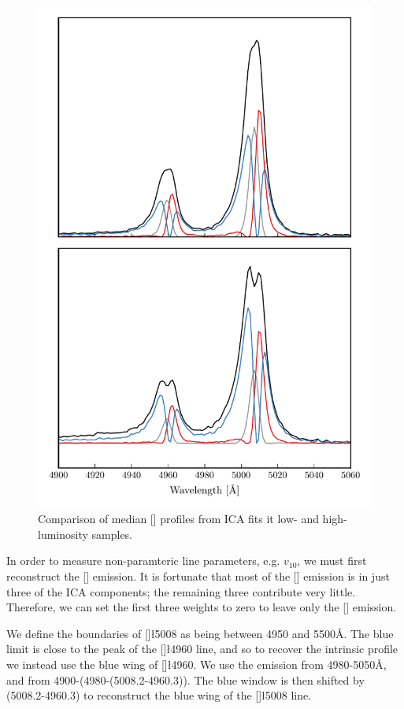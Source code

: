 \begin{figure}
    \centering
    \includegraphics[width=0.8\columnwidth]{figures/chapter04/mfica_components_oiii_comparison.pdf} 
    \caption{Comparison of median [] profiles from ICA fits it low- and high-luminosity samples. }     
    \label{fig:mfica_components_oiii_comparison}
\end{figure}

In order to measure non-paramteric line parameters, e.g. $v_10$, we must first reconstruct the [] emission. 
It is fortunate that most of the [] emission is in just three of the ICA components; the remaining three contribute very little. 
Therefore, we can set the first three weights to zero to leave only the [] emission. 

We define the boundaries of []\l5008 as being between 4950 and 5500\AA. 
The blue limit is close to the peak of the []\l4960 line, and so to recover the intrinsic profile we instead use the blue wing of []\l4960. 
We use the emission from 4980-5050\AA, and from 4900-(4980-(5008.2-4960.3)). 
The blue window is then shifted by (5008.2-4960.3) to reconstruct the blue wing of the []\l5008 line. 

